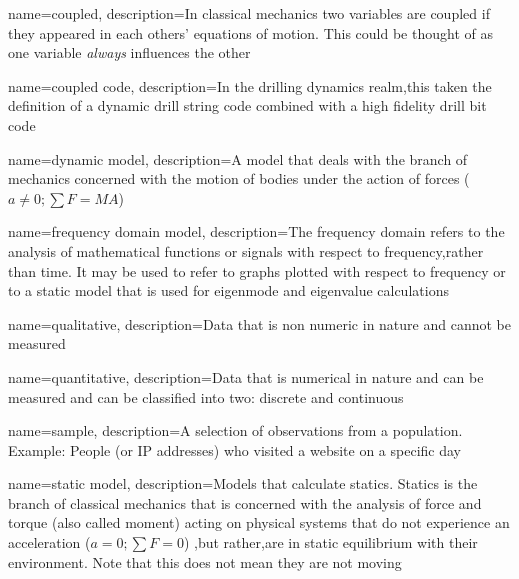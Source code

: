 

\newcommand*{\comma}{,}


{
	name=coupled,
	description=In classical mechanics two variables are coupled if they appeared in each others' equations of motion.  This could be thought of as one variable \textit{always} influences the other
}

{
	name=coupled code,
	description=In the drilling dynamics realm\comma this taken the definition of a dynamic drill string code combined with a high fidelity drill bit code
}

\newcommand*{\dynamicforcebalance}{$a \neq 0; \sum F = MA$}
{
	name=dynamic model,
	description=A model that deals with the branch of mechanics concerned with the motion of bodies under the action of forces (\dynamicforcebalance)
}

{
	name=frequency domain model,
	description=The frequency domain refers to the analysis of mathematical functions or signals with respect to frequency\comma rather than time.  It may be used to refer to graphs plotted with respect to frequency or to a static model that is used for eigenmode and eigenvalue calculations
}

{
	name=qualitative,
	description={Data that is non numeric in nature and cannot be measured}
}

{
	name=quantitative,
	description={Data that is numerical in nature and can be measured and can be classified into two: discrete and continuous}
}

{
	name=sample,
	description={A selection of observations from a population.  Example: People (or IP addresses) who visited a website on a specific day}
}

\newcommand*{\staticforcebalance}{$a = 0; \sum F = 0$}
{
	name=static model,
	description=Models that calculate statics.  Statics is the branch of classical mechanics that is concerned with the analysis of force and torque (also called moment) acting on physical systems that do not experience an acceleration (\staticforcebalance) \comma but rather\comma are in static equilibrium with their environment.  Note that this does not mean they are not moving
}

